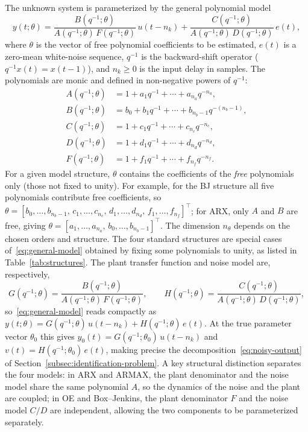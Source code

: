 \documentclass{ifacconf}
\begin{document}
The unknown system is parameterized by the general polynomial model
\begin{equation}
    y(t;\theta) = \frac{B(q^{-1};\theta)}{A(q^{-1};\theta)\,F(q^{-1};\theta)}\,u(t-n_k)
           + \frac{C(q^{-1};\theta)}{A(q^{-1};\theta)\,D(q^{-1};\theta)}\,e(t),
    \label{eq:general-model}
\end{equation}
where $\theta$ is the vector of free polynomial coefficients to be estimated,
$e(t)$ is a zero-mean white-noise sequence, $q^{-1}$ is the
backward-shift operator ($q^{-1}x(t) = x(t-1)$),
and $n_k \geq 0$ is the input delay in samples.
The polynomials are monic and defined in non-negative powers of $q^{-1}$:
\begin{align*}
    A(q^{-1};\theta) &= 1 + a_1 q^{-1} + \cdots + a_{n_a} q^{-n_a}, \\
    B(q^{-1};\theta) &= b_0 + b_1 q^{-1} + \cdots + b_{n_b-1}q^{-(n_b-1)}, \\
    C(q^{-1};\theta) &= 1 + c_1 q^{-1} + \cdots + c_{n_c} q^{-n_c}, \\
    D(q^{-1};\theta) &= 1 + d_1 q^{-1} + \cdots + d_{n_d} q^{-n_d}, \\
    F(q^{-1};\theta) &= 1 + f_1 q^{-1} + \cdots + f_{n_f} q^{-n_f}.
\end{align*}
For a given model structure, $\theta$ contains the coefficients of the
\emph{free} polynomials only (those not fixed to unity).  For example, for
the BJ structure all five polynomials contribute free coefficients, so
$\theta = [b_0,\ldots,b_{n_b-1},\,c_1,\ldots,c_{n_c},\,
           d_1,\ldots,d_{n_d},\,f_1,\ldots,f_{n_f}]^\top$;
for ARX, only $A$ and $B$ are free, giving
$\theta = [a_1,\ldots,a_{n_a},\,b_0,\ldots,b_{n_b-1}]^\top$.
The dimension $n_\theta$ depends on the chosen orders and structure.
The four standard structures are special cases of~\eqref{eq:general-model}
obtained by fixing some polynomials to unity, as listed in
Table~\ref{tab:structures}.
The plant transfer function and noise model are, respectively,
\begin{equation}
    G(q^{-1};\theta) = \frac{B(q^{-1};\theta)}{A(q^{-1};\theta)\,F(q^{-1};\theta)},
    \qquad
    H(q^{-1};\theta) = \frac{C(q^{-1};\theta)}{A(q^{-1};\theta)\,D(q^{-1};\theta)},
    \label{eq:gh}
\end{equation}
so~\eqref{eq:general-model} reads compactly as
$y(t;\theta) = G(q^{-1};\theta)\,u(t-n_k) + H(q^{-1};\theta)\,e(t)$.
At the true parameter vector $\theta_0$ this gives
$y_0(t) = G(q^{-1};\theta_0)\,u(t-n_k)$ and
$v(t) = H(q^{-1};\theta_0)\,e(t)$, making precise the
decomposition~\eqref{eq:noisy-output} of
Section~\ref{subsec:identification-problem}.
A key structural distinction
separates the four models: in ARX and ARMAX, the plant denominator and the
noise model share the same polynomial $A$, so the dynamics of the noise
and the plant are coupled; in OE and Box--Jenkins, the plant denominator
$F$ and the noise model $C/D$ are independent, allowing the two components
to be parameterized separately.
\end{document}
